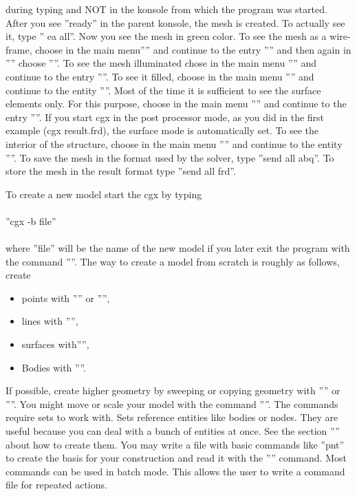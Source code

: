 \documentclass{article}
\begin{document}
during typing and NOT in the konsole from which the program was started. After you see ''ready'' in the parent konsole, the mesh is created. To actually see it, type '' ea all''. Now you see the mesh in green color. To see the mesh as a wire-frame, choose in the main menu'''' and continue to the entry '''' and then again in '''' choose ''''. To see the mesh illuminated chose in the main menu '''' and continue to the entry ''''. To see it filled, choose in the main menu '''' and continue to the entity ''''. Most of the time it is sufficient to see the surface elements only. For this purpose, choose in the main menu '''' and continue to the entry ''''. If you start cgx in the post processor mode, as you did in the first example (cgx result.frd), the surface mode is automatically set. To see the interior of the structure, choose in the main menu '''' and continue to the entity ''''. To save the mesh in the format used by the solver, type ''send all abq''. To store the mesh in the result format type ''send all frd''. 

To create a new model start the cgx by typing\\\\  ''cgx -b file''\\\\where ''file'' will be the name of the new model if you later exit the program with the command ''''. The way to create a model from scratch is roughly as follows, create
\begin{itemize}
\item points with '''' or '''',
\item lines with '''',
\item surfaces with'''',
\item Bodies with ''''.
\end{itemize}
If possible, create higher geometry by sweeping or copying geometry with '''' or ''''. You might move or scale your model with the command ''''. The commands require sets to work with. Sets reference entities like bodies or nodes. They are useful because you can deal with a bunch of entities at once. See the section '''' about how to create them.
You may write a file with basic commands like ''pnt'' to create the basis for your construction and read it with the '''' command. Most commands can be used in batch mode. This allows the user to write a command file for repeated actions.
\end{document}
